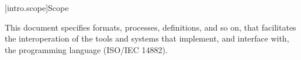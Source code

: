 
[intro.scope]{Scope}

\pnum
{}%
This document specifies formats, processes, definitions, and so on, that
facilitates the interoperation of the tools and systems that implement, and
interface with, the \Cpp{} programming language (ISO/IEC 14882).
